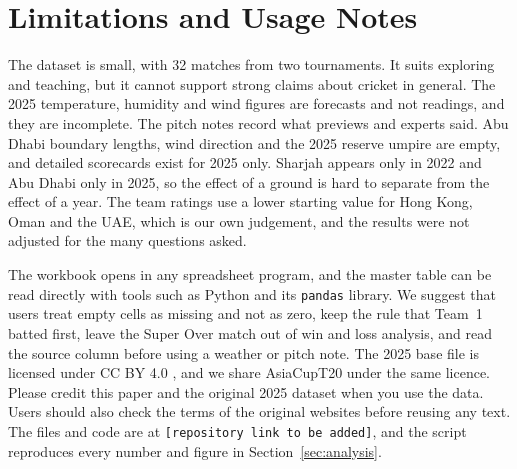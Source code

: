 \section{Limitations and Usage Notes}
\label{sec:limits}
The dataset is small, with 32 matches from two tournaments. It suits exploring and teaching, but it cannot support strong claims about cricket in general. The 2025 temperature, humidity and wind figures are forecasts and not readings, and they are incomplete. The pitch notes record what previews and experts said. Abu Dhabi boundary lengths, wind direction and the 2025 reserve umpire are empty, and detailed scorecards exist for 2025 only. Sharjah appears only in 2022 and Abu Dhabi only in 2025, so the effect of a ground is hard to separate from the effect of a year. The team ratings use a lower starting value for Hong Kong, Oman and the UAE, which is our own judgement, and the results were not adjusted for the many questions asked.

The workbook opens in any spreadsheet program, and the master table can be read directly with tools such as Python and its \texttt{pandas} library. We suggest that users treat empty cells as missing and not as zero, keep the rule that Team~1 batted first, leave the Super Over match out of win and loss analysis, and read the source column before using a weather or pitch note. The 2025 base file is licensed under CC BY 4.0 \cite{razadata}, and we share AsiaCupT20 under the same licence. Please credit this paper and the original 2025 dataset when you use the data. Users should also check the terms of the original websites before reusing any text. The files and code are at \texttt{[repository link to be added]}, and the script reproduces every number and figure in Section~\ref{sec:analysis}.
